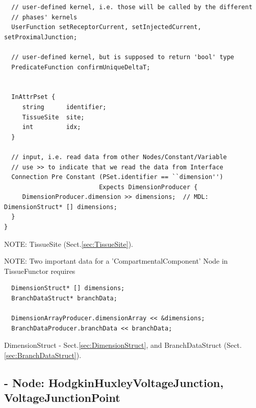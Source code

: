 {\begin{lstlisting}
  // user-defined kernel, i.e. those will be called by the different
  // phases' kernels
  UserFunction setReceptorCurrent, setInjectedCurrent, setProximalJunction;
  
  // user-defined kernel, but is supposed to return 'bool' type
  PredicateFunction confirmUniqueDeltaT;
 
 
  InAttrPset {
     string      identifier;
     TissueSite  site;
     int         idx;
  }
  
  // input, i.e. read data from other Nodes/Constant/Variable
  // use >> to indicate that we read the data from Interface
  Connection Pre Constant (PSet.identifier == ``dimension'')
                          Expects DimensionProducer { 
     DimensionProducer.dimension >> dimensions;  // MDL: DimensionStruct* [] dimensions;
  }
}
\end{lstlisting}
}
NOTE: TissueSite (Sect.\ref{sec:TissueSite}).


NOTE: Two important data for a 'CompartmentalComponent' Node in TissueFunctor
requires
\begin{verbatim}
  DimensionStruct* [] dimensions;
  BranchDataStruct* branchData;

  DimensionArrayProducer.dimensionArray << &dimensions;
  BranchDataProducer.branchData << branchData;
\end{verbatim}
DimensionStruct - Sect.\ref{sec:DimensionStruct}, and BranchDataStruct
(Sect.\ref{sec:BranchDataStruct}).







\subsection{- Node: HodgkinHuxleyVoltageJunction,
VoltageJunctionPoint}
\label{sec:HodgkinHuxleyVoltageJunction.mdl}

